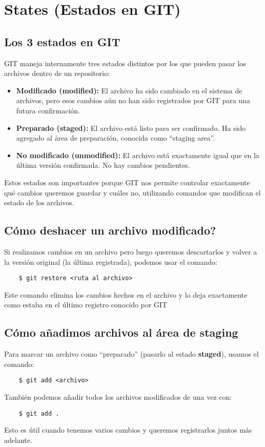 \section{States (Estados en GIT)}

    \subsection{Los 3 estados en GIT}
        GIT maneja internamente tres estados distintos por los que pueden pasar los archivos dentro de un repositorio:
        \begin{itemize}
            \item \textbf{Modificado (modified):} El archivo ha sido cambiado en el sistema de archivos, pero esos cambios a\'un no han sido registrados por GIT para una futura confirmaci\'on.
            \item \textbf{Preparado (staged):} El archivo est\'a listo para ser confirmado. Ha sido agregado al \'area de preparaci\'on, conocida como ``staging area''.
            \item \textbf{No modificado (unmodified):} El archivo est\'a exactamente igual que en la \'ultima versión confirmada. No hay cambios pendientes.
        \end{itemize}
        Estos estados son importantes porque GIT nos permite controlar exactamente qu\'e cambios queremos guardar y cu\'ales no, utilizando comandos que modifican el estado de los archivos.

    \subsection{C\'omo deshacer un archivo modificado?}
        Si realizamos cambios en un archivo pero luego queremos descartarlos y volver a la versi\'on original (la \'ultima registrada), podemos usar el comando:
        \begin{lstlisting}
    $ git restore <ruta al archivo>
        \end{lstlisting}
        Este comando elimina los cambios hechos en el archivo y lo deja exactamente como estaba en el \'ultimo registro conocido por GIT

    \subsection{Cómo a\~nadimos archivos al área de staging}
        Para marcar un archivo como ``preparado'' (pasarlo al estado \textbf{staged}), usamos el comando:
        \begin{lstlisting}
    $ git add <archivo>
        \end{lstlisting}
        Tambi\'en podemos añadir todos los archivos modificados de una vez con:
        \begin{lstlisting}
    $ git add .
        \end{lstlisting}
        Esto es \'util cuando tenemos varios cambios y queremos registrarlos juntos m\'as adelante.

